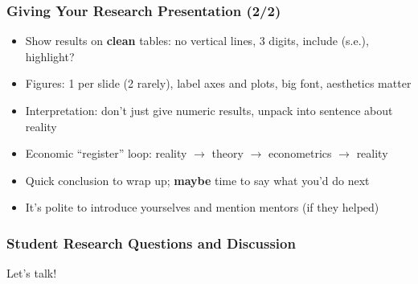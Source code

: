 \documentclass[aspectratio=169]{beamer}
\begin{document}
\begin{frame}
\frametitle{Giving Your Research Presentation (2/2)}
\begin{itemize}
	\item Show results on \textbf{clean} tables: no vertical lines, 3 digits, include (s.e.), highlight?
	
	\item Figures: 1 per slide (2 rarely), label axes and plots, big font, aesthetics matter
	
	\item <2->Interpretation: don't just give numeric results, unpack into sentence about reality
	
	\item <2->Economic ``register'' loop: reality $\rightarrow$ theory $\rightarrow$ econometrics $\rightarrow$ reality
	
	\item <3->Quick conclusion to wrap up; \textbf{maybe} time to say what you'd do next
	
	\item <3->It's polite to introduce yourselves and mention mentors (if they helped)
\end{itemize}
\end{frame}



\begin{frame}
\frametitle{Student Research Questions and Discussion}

Let's talk!

\end{frame}
\end{document}

